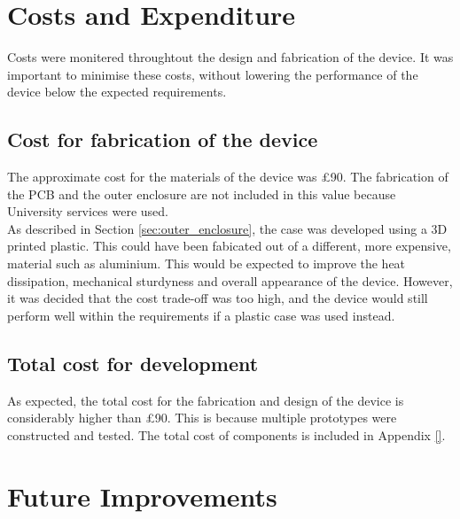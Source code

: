 \documentclass[a4paper,12pt]{article}
\begin{document}



\newpage
\section{Costs and Expenditure}
\label{sec:cost}

Costs were monitered throughtout the design and fabrication of the device. It was important to minimise these costs, without lowering the performance of the device below the expected requirements.

\subsection{Cost for fabrication of the device}
\label{sec:device_cost}

The approximate cost for the materials of the device was £90. The fabrication of the PCB and the outer enclosure are not included in this value because University services were used. \\

As described in Section \ref{sec:outer_enclosure}, the case was developed using a 3D printed plastic. This could have been fabicated out of a different, more expensive, material such as aluminium. This would be expected to improve the heat dissipation, mechanical sturdyness and overall appearance of the device. However, it was decided that the cost trade-off was too high, and the device would still perform well within the requirements if a plastic case was used instead.

\subsection{Total cost for development}
\label{sec:total_cost}

As expected, the total cost for the fabrication and design of the device is considerably higher than £90. This is because multiple prototypes were constructed and tested. The total cost of components is included in Appendix \ref{}.


\newpage
\section{Future Improvements}
\label{sec:future_improvements}
\end{document}
